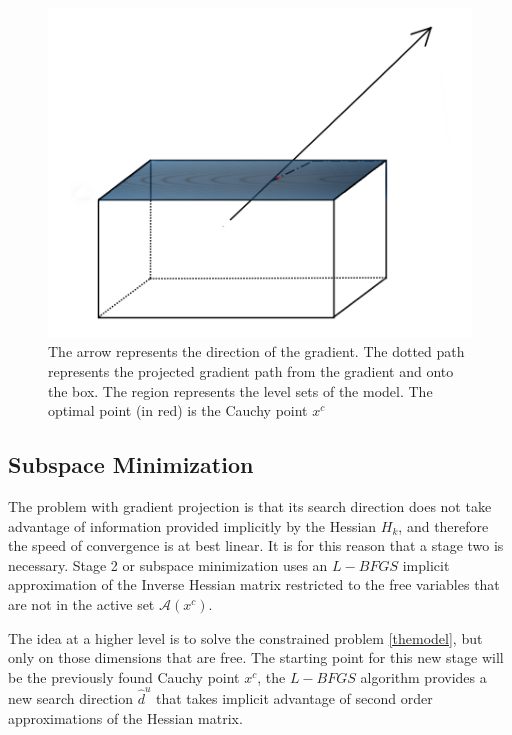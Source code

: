 \begin{figure}
\begin{center}
\includegraphics[scale=0.5]{Figures/cajapresentation2.png}
\caption[Graphical Representation of Gradient Projection]{The arrow represents the direction of the gradient. The dotted path represents the projected gradient path from the gradient and onto the box. The region represents the level sets of the model. The optimal point (in red) is the Cauchy point $x^c$}
\end{center}
\end{figure}

\subsection{Subspace Minimization}

The problem with gradient projection is that its search direction does not take advantage of information provided implicitly by the Hessian $H_k$, and therefore the speed of convergence is at best linear. It is for this reason that a stage two is necessary. Stage 2 or subspace minimization uses an $L-BFGS$ implicit approximation of the Inverse Hessian matrix restricted to the free variables that are not in the active set $\mathcal{A}(x^c)$.

The idea at a higher level is to solve the constrained problem \ref{themodel}, but only on those dimensions that are free. The starting point for this new stage will be the previously found Cauchy point $x^c$, the $L-BFGS$ algorithm provides a new search direction $\hat{d}^u$ that takes implicit advantage of second order approximations of the Hessian matrix.

